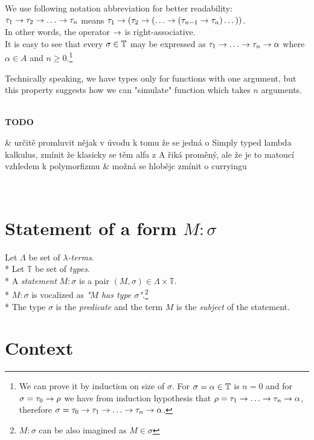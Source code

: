 \documentclass[12pt,a4paper]{report}
\newcommand{\lterms}{$\lambda$-terms\xspace}
\newenvironment{todo}
{ ~\\[0.5em]
  \textbf{TODO}
  \begin{easylist}[itemize]}
{ \end{easylist}
  ~}
\begin{document}
We use following notation
abbreviation for better readability:\\

$\tau_1 \ar \tau_2 \ar \dots \ar \tau_n$ means 
$\tau_1 \ar (\tau_2 \ar (\dots \ar (\tau_{n-1} \ar \tau_n)\dots))$.\\

In other words, the operator $\rightarrow$ is right-associative.\\

It is easy to see that every $\sigma \in \mathbb{T}$ may be expressed as 
$\tau_1 \ar \dots \ar \tau_n \ar \alpha$ 
where $\alpha \in A$ and $n \geq 0$.\footnote{ 
We can prove it by induction on size of $\sigma$. 
For $\sigma = \alpha \in \mathbb{T}$ is $n = 0$ and for $\sigma = \tau_0 \rightarrow \rho$
we have from induction hypothesis that $\rho = \tau_1 \ar \dots \ar \tau_n \ar \alpha$,
therefore
$\sigma = \tau_0 \ar \tau_1 \ar \dots \ar \tau_n \ar \alpha$.}

Technically speaking, we have types only for functions with one argument, but
this property suggests how we can "simulate" function which takes $n$ arguments.
  



\begin{todo}
   & určitě promluvit nějak v úvodu k tomu že se jedná o 
	 Simply typed lambda kalkulus, zmínit že klasicky se těm alfa z A 
	 řiká proměný, ale že je to matoucí vzhledem k polymorfizmu
   & možná se hlobějc zmínit o curryingu  
\end{todo}


	

	
\section{Statement of a form $M : \sigma$}

	Let $\Lambda$ be set of {\it \lterms}. \\*
	Let $\mathbb{T}$ be set of {\it types}.       \\*
	A {\it statement} $M : \sigma$ is a pair $(M,\sigma) \in \Lambda \times \mathbb{T}$. \\*
	$M : \sigma$ is vocalized as {\it "$M$ has type $\sigma$"}.\footnote{ 
	$M : \sigma$ can be also imagined as $M \in \sigma$ } \\*
	The type $\sigma$ is the {\it predicate} and the term $M$ is the
	{\it subject} of the statement.  
	
\section{Context}
\end{document}
